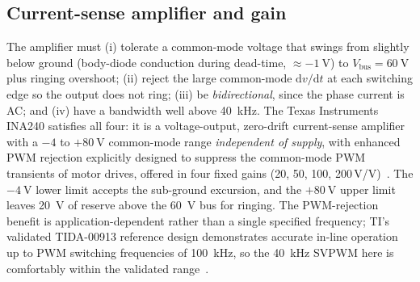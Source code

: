 \documentclass[journal,onecolumn,11pt]{IEEEtran}
\newcommand{\Vbus}{V_{\mathrm{bus}}}
\begin{document}
\subsection{Current-sense amplifier and gain}\label{sec:csa}
The amplifier must (i) tolerate a common-mode voltage that swings from slightly below ground
(body-diode conduction during dead-time, $\approx-\SI{1}{\volt}$) to $\Vbus=\SI{60}{\volt}$ plus
ringing overshoot; (ii) reject the large common-mode $\mathrm{d}v/\mathrm{d}t$ at each switching
edge so the output does not ring; (iii) be \emph{bidirectional}, since the phase current is AC; and
(iv) have a bandwidth well above \SI{40}{\kilo\hertz}. The Texas Instruments INA240 satisfies all
four: it is a voltage-output, zero-drift current-sense amplifier with a $-4$ to $+\SI{80}{\volt}$
common-mode range \emph{independent of supply}, with enhanced PWM rejection explicitly designed to
suppress the common-mode PWM transients of motor drives, offered in four fixed gains
(\num{20}, \num{50}, \num{100}, \num{200}\,V/V)~\cite{ina240ds}. The $-\SI{4}{\volt}$ lower limit
accepts the sub-ground excursion, and the $+\SI{80}{\volt}$ upper limit leaves \SI{20}{\volt} of
reserve above the \SI{60}{\volt} bus for ringing. The PWM-rejection benefit is application-dependent
rather than a single specified frequency; TI's validated TIDA-00913 reference design demonstrates
accurate in-line operation up to PWM switching frequencies of \SI{100}{\kilo\hertz}, so the
\SI{40}{\kilo\hertz} SVPWM here is comfortably within the validated range~\cite{ina240ds,tida00913}.
\end{document}
